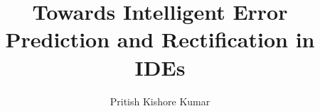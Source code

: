 \documentclass[sigplan,screen,9pt]{acmart}
\begin{document}
    \title{Towards Intelligent Error Prediction and Rectification in IDEs}

    \author{Pritish Kishore Kumar}




    \maketitle
\end{document}
